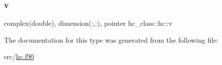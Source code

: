 \subsubsection{\texorpdfstring{v}{v}}
{\footnotesize\ttfamily complex(double), dimension(\+:,\+:), pointer hc\+\_\+class\+::hc\+::v\hspace{0.3cm}{\ttfamily [private]}}



The documentation for this type was generated from the following file\+:\begin{DoxyCompactItemize}
\item 
src/\hyperlink{hc_8f90}{hc.\+f90}\end{DoxyCompactItemize}
